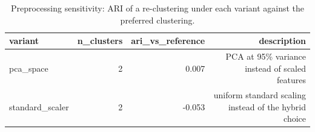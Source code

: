 \begin{table}[htbp]
\centering
\begin{tabular}{lrrr}
\toprule
variant & n\_clusters & ari\_vs\_reference & description \\
\midrule
pca\_space & 2 & 0.007 & PCA at 95\% variance instead of scaled features \\
standard\_scaler & 2 & -0.053 & uniform standard scaling instead of the hybrid choice \\
\bottomrule
\end{tabular}
\caption{Preprocessing sensitivity: ARI of a re-clustering under each variant against the preferred clustering.}
\label{tab:sensitivity}
\end{table}

